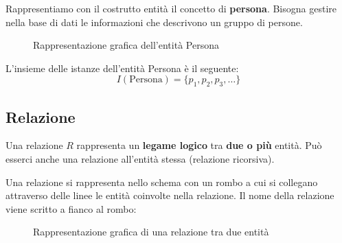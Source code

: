\documentclass[a4paper]{article}
\begin{document}
\begin{example}
  Rappresentiamo con il costrutto entità il concetto di \textbf{persona}. Bisogna gestire
  nella base di dati le informazioni che descrivono un gruppo di persone.
  \begin{figure}[H]
    \centering
    \caption{Rappresentazione grafica dell'entità Persona}
  \end{figure}
  L'insieme delle istanze dell'entità Persona è il seguente:
  \[
    I(\text{Persona}) = \{p_1, p_2, p_3, \ldots\}
  \]
\end{example}

\subsection{Relazione}
Una relazione \( R \) rappresenta un \textbf{legame logico} tra \textbf{due o più} entità.
Può esserci anche una relazione all'entità stessa (relazione ricorsiva).

\vspace{1em}
\noindent
Una relazione si rappresenta nello schema con un rombo a cui si collegano attraverso delle
linee le entità coinvolte nella relazione. Il nome della relazione viene scritto a fianco
al rombo:
\begin{figure}[H]
  \centering
  \caption{Rappresentazione grafica di una relazione tra due entità}
\end{figure}
\end{document}
